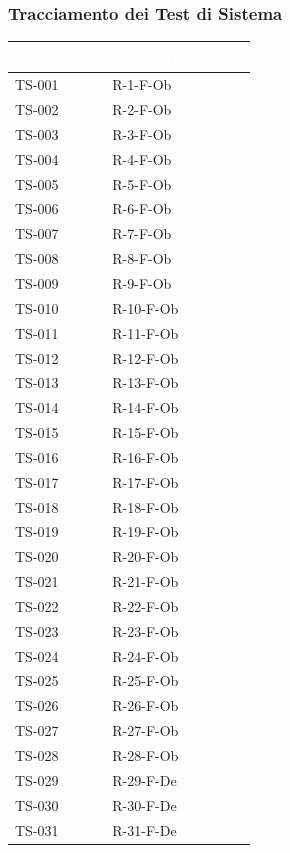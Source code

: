 \documentclass[a4paper, 11pt]{article}
\renewcommand{\arraystretch}{1.4} %
\begin{document}
\subsubsection{Tracciamento dei Test di Sistema}
\renewcommand{\arraystretch}{1.4}
\setlength{\LTleft}{0pt plus 1fill}\setlength{\LTright}{0pt plus 1fill}\begin{longtable}{>{\centering\arraybackslash}m{2.5cm} >{\centering\arraybackslash}m{3.5cm}}
\rowcolor{AccentColor}
\textcolor{white}{\textbf{Codice Test}} & \textcolor{white}{\textbf{Codice Requisito\textsuperscript{G}}} \\
\endhead

TS-001 & R-1-F-Ob \\
TS-002 & R-2-F-Ob \\
TS-003 & R-3-F-Ob \\
TS-004 & R-4-F-Ob \\
TS-005 & R-5-F-Ob \\
TS-006 & R-6-F-Ob \\
TS-007 & R-7-F-Ob \\
TS-008 & R-8-F-Ob \\
TS-009 & R-9-F-Ob \\
TS-010 & R-10-F-Ob \\
TS-011 & R-11-F-Ob \\
TS-012 & R-12-F-Ob \\
TS-013 & R-13-F-Ob \\
TS-014 & R-14-F-Ob \\
TS-015 & R-15-F-Ob \\
TS-016 & R-16-F-Ob \\
TS-017 & R-17-F-Ob \\
TS-018 & R-18-F-Ob \\
TS-019 & R-19-F-Ob \\
TS-020 & R-20-F-Ob \\
TS-021 & R-21-F-Ob \\
TS-022 & R-22-F-Ob \\
TS-023 & R-23-F-Ob \\
TS-024 & R-24-F-Ob \\
TS-025 & R-25-F-Ob \\
TS-026 & R-26-F-Ob \\
TS-027 & R-27-F-Ob \\
TS-028 & R-28-F-Ob \\
TS-029 & R-29-F-De \\
TS-030 & R-30-F-De \\
TS-031 & R-31-F-De \\

\end{longtable}
\end{document}
